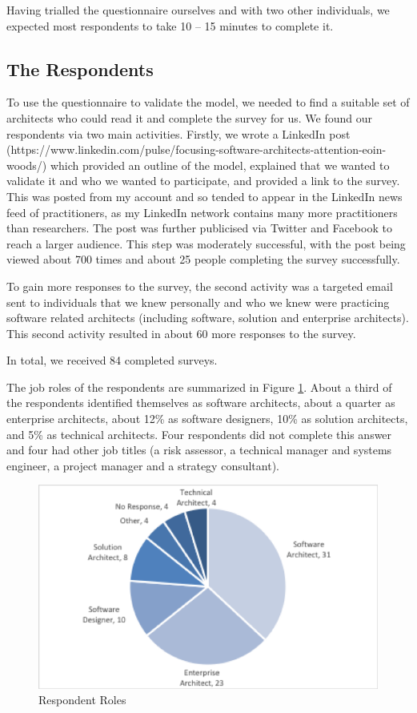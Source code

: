 Having trialled the questionnaire ourselves and with two other individuals, we expected most respondents to take 10 – 15 minutes to complete it.

\subsection{The Respondents}

To use the questionnaire to validate the model, we needed to find a suitable set of architects who could read it and complete the survey for us.  We found our respondents via two main activities.  
Firstly, we wrote a LinkedIn post (https://www.linkedin.com/pulse/focusing-software-architects-attention-eoin-woods/) which provided an outline of the model, explained that we wanted to validate it and who we wanted to participate, and provided a link to the survey.  This was posted from my account and so tended to appear in the LinkedIn news feed of practitioners, as my LinkedIn network contains many more practitioners than researchers.  The post was further publicised via Twitter and Facebook to reach a larger audience.  This step was moderately successful, with the post being viewed about 700 times and about 25 people completing the survey successfully.

To gain more responses to the survey, the second activity was a targeted email sent to individuals that we knew personally and who we knew were practicing software related architects (including software, solution and enterprise architects).  This second activity resulted in about 60 more responses to the survey.

In total, we received 84 completed surveys.

The job roles of the respondents are summarized in Figure \ref{figure:resproles}.  About a third of the respondents identified themselves as software architects, about a quarter as enterprise architects, about 12\% as software designers, 10\% as solution architects, and 5\% as technical architects.  Four respondents did not complete this answer and four had other job titles (a risk assessor, a technical manager and systems engineer, a project manager and a strategy consultant).

\begin{figure}
\centering
\includegraphics[width=12cm]{Figures/prioritisation-detailed-roles}
\caption{Respondent Roles}
\label{figure:resproles}
\end{figure}


